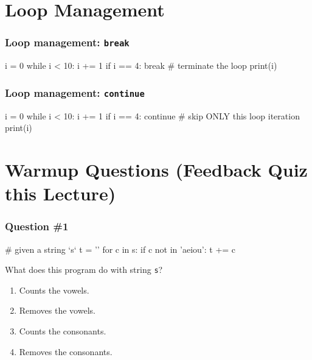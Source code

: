 \documentclass[11pt]{beamer}
\begin{document}
\section{Loop Management}

\begin{frame}[fragile]
  \frametitle{Loop management:  \texttt{break}}
  \Enlarge

  \begin{semiverbatim}
i = 0
while i < 10:
    i += 1
    if i == 4:
        break  # terminate the loop
    print(i)
  \end{semiverbatim}
\end{frame}

\begin{frame}[fragile]
  \frametitle{Loop management:  \texttt{continue}}
  \Enlarge

  \begin{semiverbatim}
i = 0
while i < 10:
    i += 1
    if i == 4:
        continue  # skip ONLY this loop iteration
    print(i)
  \end{semiverbatim}
\end{frame}


\section{Warmup Questions (Feedback Quiz this Lecture)}

\begin{frame}[fragile]
	\frametitle{Question \#1}
	\Enlarge
	
	\begin{semiverbatim}
# given a string `s`
t = ''
for c in s:
  if c not in 'aeiou':
    t += c
    \end{semiverbatim}
	What does this program do with string \texttt{s}?
	\begin{enumerate}[label=\Alph*]
		\item  Counts the vowels.
		\item  Removes the vowels. %
		\item  Counts the consonants.
		\item  Removes the consonants.
	\end{enumerate}
\end{frame}
\end{document}
